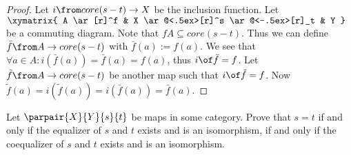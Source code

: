 \begin{answer}
  \begin{proof}
    Let $i \from core(s-t) \to X$ be the inclusion function. Let
    $\xymatrix{
      A \ar[r]^f & X \ar@<.5ex>[r]^s \ar@<-.5ex>[r]_t & Y
    }$
    be a commuting diagram. Note that $f A \subseteq core(s-t)$.
    Thus we can define $\bar{f} \from A \to core(s-t)$ with $\bar{f}(a) := f(a)$.
    We see that $\forall a \in A: i(\bar{f}(a))=\bar{f}(a)=f(a)$, thus $i \of \bar{f} = f$.
    Let $\tilde{f} \from A \to core(s-t)$ be another map such that $i \of \tilde{f} = f$.
    Now $\tilde{f}(a) = i(\tilde{f}(a)) = i(\bar{f}(a)) = \bar{f}(a)$.
  \end{proof}
\end{answer}

\begin{exercise}
  Let $\parpair{X}{Y}{s}{t}$ be maps in some category.  Prove that $s = t$ if
  and only if the equalizer of $s$ and $t$ exists and is an isomorphism, if
  and only if the coequalizer of $s$ and $t$ exists and is an isomorphism.
\end{exercise}


